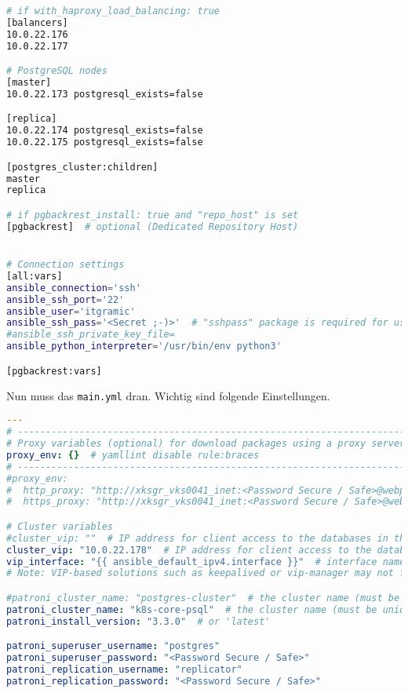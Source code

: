 \begin{flushleft}
\begin{lstlisting}[language=bash, caption=Testsystem - Deployment - inventory,captionpos=b,label={lst:testsystem-deployment-inventory},breaklines=true]
# if with_haproxy_load_balancing: true
[balancers]
10.0.22.176
10.0.22.177

# PostgreSQL nodes
[master]
10.0.22.173 postgresql_exists=false

[replica]
10.0.22.174 postgresql_exists=false
10.0.22.175 postgresql_exists=false

[postgres_cluster:children]
master
replica

# if pgbackrest_install: true and "repo_host" is set
[pgbackrest]  # optional (Dedicated Repository Host)


# Connection settings
[all:vars]
ansible_connection='ssh'
ansible_ssh_port='22'
ansible_user='itgramic'
ansible_ssh_pass='<Secret ;-)>'  # "sshpass" package is required for use "ansible_ssh_pass"
#ansible_ssh_private_key_file=
ansible_python_interpreter='/usr/bin/env python3'

[pgbackrest:vars]

    \end{lstlisting}
    Nun muss das \texttt{main.yml} dran.
    Wichtig sind folgende Einstellungen.
    \lstset{style=gra_codestyle}
    \begin{lstlisting}[language=yaml, caption=Testsystem - Deployment - main.yml,captionpos=b,label={lst:testsystem-deployment-main.yml},breaklines=true]
---
# ---------------------------------------------------------------------
# Proxy variables (optional) for download packages using a proxy server
proxy_env: {}  # yamllint disable rule:braces
# ---------------------------------------------------------------------
#proxy_env:
#  http_proxy: "http://xksgr_vks0041_inet:<Password Secure / Safe>@webproxy.sivc.first-it.ch:9090"
#  https_proxy: "http://xksgr_vks0041_inet:<Password Secure / Safe>@webproxy.sivc.first-it.ch:9090"

# Cluster variables
#cluster_vip: ""  # IP address for client access to the databases in the cluster (optional).
cluster_vip: "10.0.22.178"  # IP address for client access to the databases in the cluster (optional).
vip_interface: "{{ ansible_default_ipv4.interface }}"  # interface name (e.g., "ens32").
# Note: VIP-based solutions such as keepalived or vip-manager may not function correctly in cloud environments like AWS.

#patroni_cluster_name: "postgres-cluster"  # the cluster name (must be unique for each cluster)
patroni_cluster_name: "k8s-core-psql"  # the cluster name (must be unique for each cluster)
patroni_install_version: "3.3.0"  # or 'latest'

patroni_superuser_username: "postgres"
patroni_superuser_password: "<Password Secure / Safe>"
patroni_replication_username: "replicator"
patroni_replication_password: "<Password Secure / Safe>"


\end{lstlisting}
\end{flushleft}
